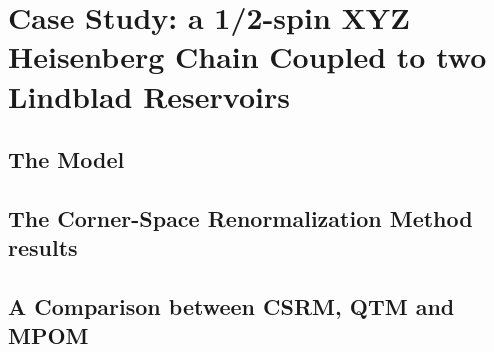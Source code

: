 \chapter{Case Study: a 1/2-spin XYZ Heisenberg Chain Coupled to two Lindblad Reservoirs}

\section{The Model}
\section{The Corner-Space Renormalization Method results}
\section{A Comparison between CSRM, QTM and MPOM}